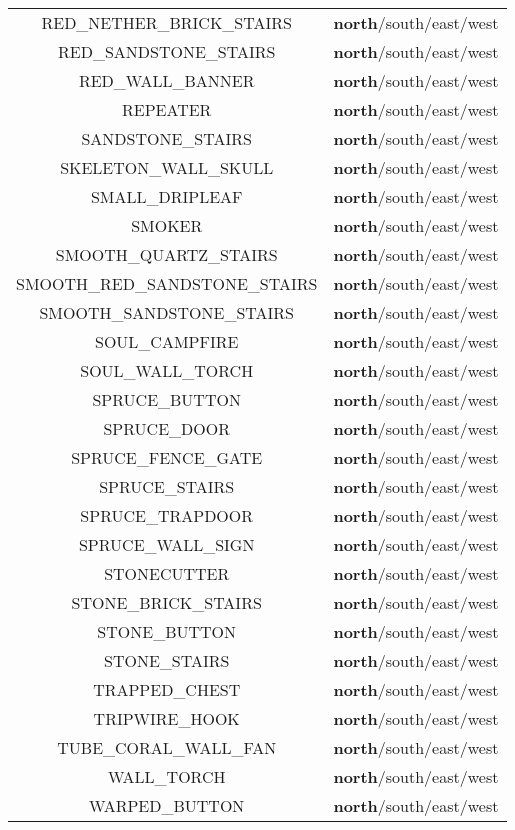 \begin{longtable}{ |c|c| }
	RED\_NETHER\_BRICK\_STAIRS & \textbf{north}/south/east/west \\
	RED\_SANDSTONE\_STAIRS & \textbf{north}/south/east/west \\
	RED\_WALL\_BANNER & \textbf{north}/south/east/west \\
	REPEATER & \textbf{north}/south/east/west \\
	SANDSTONE\_STAIRS & \textbf{north}/south/east/west \\
	SKELETON\_WALL\_SKULL & \textbf{north}/south/east/west \\
	SMALL\_DRIPLEAF & \textbf{north}/south/east/west \\
	SMOKER & \textbf{north}/south/east/west \\
	SMOOTH\_QUARTZ\_STAIRS & \textbf{north}/south/east/west \\
	SMOOTH\_RED\_SANDSTONE\_STAIRS & \textbf{north}/south/east/west \\
	SMOOTH\_SANDSTONE\_STAIRS & \textbf{north}/south/east/west \\
	SOUL\_CAMPFIRE & \textbf{north}/south/east/west \\
	SOUL\_WALL\_TORCH & \textbf{north}/south/east/west \\
	SPRUCE\_BUTTON & \textbf{north}/south/east/west \\
	SPRUCE\_DOOR & \textbf{north}/south/east/west \\
	SPRUCE\_FENCE\_GATE & \textbf{north}/south/east/west \\
	SPRUCE\_STAIRS & \textbf{north}/south/east/west \\
	SPRUCE\_TRAPDOOR & \textbf{north}/south/east/west \\
	SPRUCE\_WALL\_SIGN & \textbf{north}/south/east/west \\
	STONECUTTER & \textbf{north}/south/east/west \\
	STONE\_BRICK\_STAIRS & \textbf{north}/south/east/west \\
	STONE\_BUTTON & \textbf{north}/south/east/west \\
	STONE\_STAIRS & \textbf{north}/south/east/west \\
	TRAPPED\_CHEST & \textbf{north}/south/east/west \\
	TRIPWIRE\_HOOK & \textbf{north}/south/east/west \\
	TUBE\_CORAL\_WALL\_FAN & \textbf{north}/south/east/west \\
	WALL\_TORCH & \textbf{north}/south/east/west \\
	WARPED\_BUTTON & \textbf{north}/south/east/west \\

\end{longtable}
